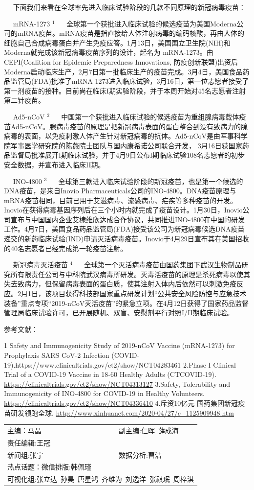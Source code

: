 \documentclass[
]{article}
\begin{document}
\(\quad\)
下面我们来看在全球率先进入临床试验阶段的几款不同原理的新冠病毒疫苗：

\(\quad\) mRNA-1273 \(^1\) \(\quad\)
全球第一个获批进入临床试验的候选疫苗为美国Moderna公司的mRNA疫苗。mRNA疫苗是指直接给人体注射病毒的编码核酸，再由人体的细胞自己合成病毒蛋白并产生免疫应答。1月13日，美国国立卫生院(NIH)和Moderna就完成该新冠病毒疫苗序列的设计，起名为
mRNA-1273。由CEPI(Coalition for Epidemic Preparedness Innovations,
防疫创新联盟)出资后Moderna启动临床生产，2月7日第一批临床生产的疫苗完成。3月4日，美国食品药品监管局(FDA)批准了mRNA-1273进入临床试验，3月16日，第一位志愿者接受了第一剂疫苗的接种。目前尚在临床I期实验阶段，并于本周开始对45名志愿者注射第二针疫苗。

\(\quad\) Ad5-nCoV \(^2\) \(\quad\)
中国第一个获批进入临床试验的候选疫苗为重组腺病毒载体疫苗Ad5-nCoV。腺病毒疫苗的原理是把新冠病毒表面的蛋白整合到没有致病力的腺病毒的表面，以免疫刺激人体产生针对新冠病毒的抗体。Ad5-nCoV是由军事科学院军事医学研究院的陈薇院士团队与国内康希诺公司联合开发，
3月16日获国家药品监督局批准展开I期临床试验，并于4月9日公布I期临床试验108名志愿者的初步安全数据，并宣布进入临床II期。

\(\quad\) INO-4800 \(^3\) \(\quad\)
全球第三款进入临床试验阶段的新冠疫苗，也是第一个候选的DNA疫苗，是来自Inovio
Pharmaceuticals公司的INO-4800。DNA疫苗原理与mRNA疫苗相同，目前已用于艾滋病毒、流感病毒、疟疾等多种疫苗的开发。Inovio在获得病毒基因序列后在三个小时内就完成了疫苗设计。1月30日，Inovio公司宣布与中国国内企业艾棣维欣达成合作协议，共同推进INO-4800在中国的研发工作。4月7日，美国食品药品监管局(FDA)接受该公司为新冠病毒候选DNA疫苗递交的新药临床试验(IND)申请灭活病毒疫苗。Inovio于4月29日宣布其在美国招收的40名志愿者已经完成第一轮疫苗注射。

\(\quad\) 新冠病毒灭活疫苗 \(^4\) \(\quad\)
全球第一个灭活病毒疫苗由国药集团下武汉生物制品研究所有限责任公司与中科院武汉病毒所研发。灭毒活疫苗的原理是杀死病毒以使其失去致病力，但保留病毒表面的蛋白质，使其注射入体内后依然可以刺激免疫反应。2月1日，该项目获得科技部国家重点研发计划``公共安全风险防控与应急技术装备''重点专项``2019-nCoV灭活疫苗''的紧急立项。在4月12日获得了国家药品监督管理局临床试验许可，已开展随机、双盲、安慰剂平行对照I/II期临床试验。

\Large 参考文献：

1 Safety and Immunogenicity Study of 2019-nCoV Vaccine (mRNA-1273) for
Prophylaxis SARS CoV-2 Infection
(COVID-19).https://www.clinicaltrials.gov/ct2/show/NCT04283461 2.Phase I
Clinical Trial of a COVID-19 Vaccine in 18-60 Healthy Adults
(CTCOVID-19). \url{https://clinicaltrials.gov/ct2/show/NCT04313127}
3.Safety, Tolerability and Immunogenicity of INO-4800 for COVID-19 in
Healthy Volunteers.
\url{https://clinicaltrials.gov/ct2/show/NCT04336410} 4.斥资10亿元
国药集团新冠疫苗研发领跑全球.
\url{http://www.xinhuanet.com/2020-04/27/c_1125909948.htm}

\vspace{5mm}

\centering
\fontsize{12}{12}
\selectfont
\begin{tabular}{ll}

主编：马晶  &  副主编:仁晖\,  薛成海  \\
责任编辑:王冠  \\
新闻组:张宁  &  数据分析:曹洁 \\
热点话题：微信排版:韩佩瑾 \\
\multicolumn{2}{l}{可视化组:张立达\, 孙昊\, 唐星鸿\, 齐维为\, 刘逸洋\, 张祺珉\, 周梓淇}

\end{tabular}
\end{document}
